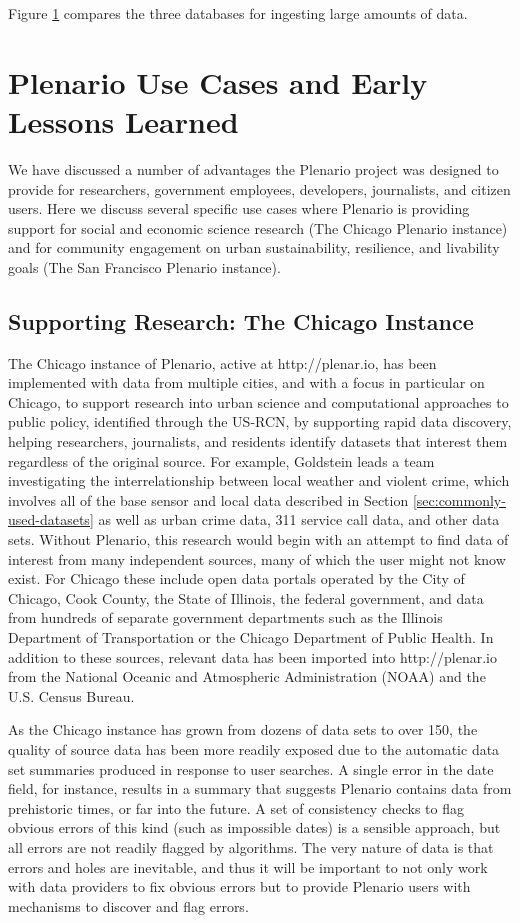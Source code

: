 \documentclass[11pt]{article}
\begin{document}
Figure \ref{} compares the three databases for ingesting large amounts of data. 
\section{Plenario Use Cases and Early Lessons Learned}
We have discussed a number of advantages the Plenario project was designed to provide for researchers, government employees, developers, journalists, and citizen users. Here we discuss several specific use cases where Plenario is providing support for social and economic science research (The Chicago Plenario instance) and for community engagement on urban sustainability, resilience, and livability goals (The San Francisco Plenario instance). 

\subsection{\textbf{Supporting Research: The Chicago Instance}}\label{chicago-instance}
The Chicago instance of Plenario, active at http://plenar.io, has been implemented with data from multiple cities, and with a focus in particular on Chicago, to support research\textit{ }into urban science and computational approaches to public policy, identified through the US-RCN, by supporting rapid data discovery, helping researchers, journalists, and residents identify datasets that interest them regardless of the original source. For example, Goldstein leads a team investigating the interrelationship between local weather and violent crime, which involves all of the base sensor and local data described in Section \ref{sec:commonly-used-datasets} as well as urban crime data, 311 service call data, and other data sets. Without Plenario, this research would begin with an attempt to find data of interest from many independent sources, many of which the user might not know exist. For Chicago these include open data portals operated by the City of Chicago, Cook County, the State of Illinois, the federal government, and data from hundreds of separate government departments such as the Illinois Department of Transportation or the Chicago Department of Public Health. In addition to these sources, relevant data has been imported into http://plenar.io from the National Oceanic and Atmospheric Administration (NOAA) and the U.S. Census Bureau. 

As the Chicago instance has grown from dozens of data sets to over 150, the quality of source data has been more readily exposed due to the automatic data set summaries produced in response to user searches. A single error in the date field, for instance, results in a summary that suggests Plenario contains data from prehistoric times, or far into the future. A set of consistency checks to flag obvious errors of this kind (such as impossible dates) is a sensible approach, but all errors are not readily flagged by algorithms. The very nature of data is that errors and holes are inevitable, and thus it will be important to not only work with data providers to fix obvious errors but to provide Plenario users with mechanisms to discover and flag errors. 
\end{document}
